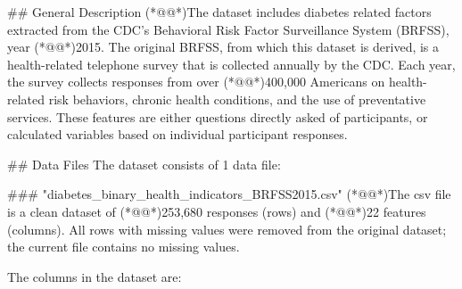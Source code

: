 \documentclass[11pt]{article}
\begin{document}
\begin{codeoutput}
\#\# General Description
(*@@*)The dataset includes diabetes related factors extracted from the CDC's Behavioral Risk Factor Surveillance System (BRFSS), year (*@@*)2015.
The original BRFSS, from which this dataset is derived, is a health-related telephone survey that is collected annually by the CDC.
Each year, the survey collects responses from over (*@@*)400,000 Americans on health-related risk behaviors, chronic health conditions, and the use of preventative services. These features are either questions directly asked of participants, or calculated variables based on individual participant responses.

\#\# Data Files
The dataset consists of 1 data file:

\#\#\# "diabetes\_binary\_health\_indicators\_BRFSS2015.csv"
(*@@*)The csv file is a clean dataset of (*@@*)253,680 responses (rows) and (*@@*)22 features (columns).
All rows with missing values were removed from the original dataset; the current file contains no missing values.

The columns in the dataset are:


\end{codeoutput}
\end{document}

